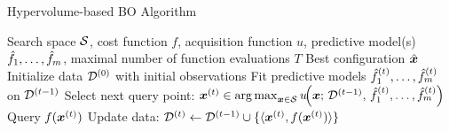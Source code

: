 \documentclass[11pt,compress,t,notes=noshow,xcolor=table]{beamer}
\begin{document}
\begin{framev}{Hypervolume-based BO Algorithm}
\begin{center}
\begin{algorithm}[H]
\caption{Hypervolume-based Bayesian optimization loop}
\begin{algorithmic}[1]
\Require Search space $\S$, cost function $f$, acquisition function $u$, predictive model(s) $\fh_1,\dots,\fh_m$, maximal number of function evaluations $T$
\Ensure Best configuration $\hat{\xv}$
\State Initialize data $\D^{(0)}$ with initial observations
\State Fit predictive models $\fh_1^{(t)}, \dots, \fh_m^{(t)}$ on $\D^{(t-1)}$
\State Select next query point:
\State $\xv^{(t)} \in \argmax_{\xv \in \S} u\!\Bigl(\xv;\, \D^{(t-1)},\, \fh_1^{(t)},\dots,\fh_m^{(t)} \Bigr)$
\State Query $f(\xv^{(t)})$
\State Update data: $\D^{(t)} \leftarrow \D^{(t-1)} \cup \{\langle \xv^{(t)},f(\xv^{(t)})\rangle\}$
\EndFor
\end{algorithmic}
\end{algorithm}
\end{center}
\end{framev}

\endlecture
\end{document}
